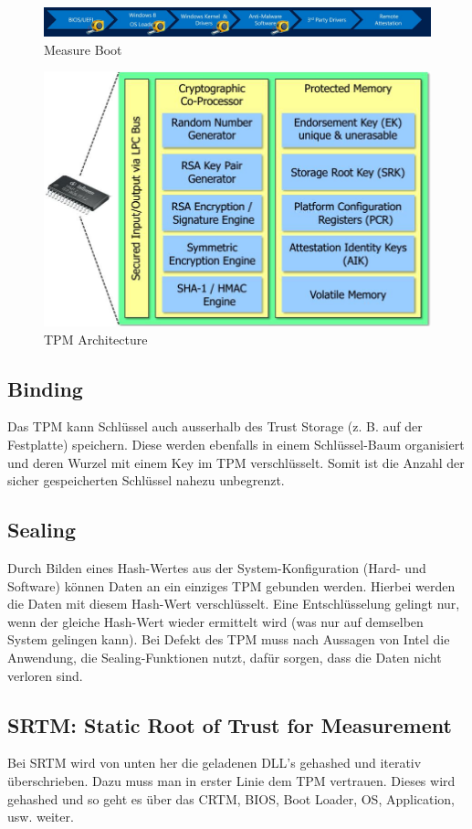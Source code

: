 \begin{figure}[h!]
	\centering
	\includegraphics[width=0.9\linewidth]{images/measure_boot}
	\caption{Measure Boot}
	\label{fig:measureboot}
\end{figure}


\begin{figure}[h]
	\centering
	\includegraphics[width=0.5\linewidth]{images/tpm_architecture}
	\caption{TPM Architecture}
	\label{fig:tpmarchitecture}
\end{figure}

\subsection{Binding}
Das TPM kann Schlüssel auch ausserhalb des Trust Storage (z. B. auf der Festplatte) speichern. Diese werden ebenfalls in einem Schlüssel-Baum organisiert und deren Wurzel mit einem Key im TPM verschlüsselt. Somit ist die Anzahl der sicher gespeicherten Schlüssel nahezu unbegrenzt.

\subsection{Sealing}
Durch Bilden eines Hash-Wertes aus der System-Konfiguration (Hard- und Software) können Daten an ein einziges TPM gebunden werden. Hierbei werden die Daten mit diesem Hash-Wert verschlüsselt. Eine Entschlüsselung gelingt nur, wenn der gleiche Hash-Wert wieder ermittelt wird (was nur auf demselben System gelingen kann). Bei Defekt des TPM muss nach Aussagen von Intel die Anwendung, die Sealing-Funktionen nutzt, dafür sorgen, dass die Daten nicht verloren sind.


\subsection{SRTM: Static Root of Trust for Measurement}
Bei SRTM wird von unten her die geladenen DLL's gehashed und iterativ überschrieben. Dazu muss man in erster Linie dem TPM vertrauen. Dieses wird gehashed und so geht es über das CRTM, BIOS, Boot Loader, OS, Application, usw. weiter.

